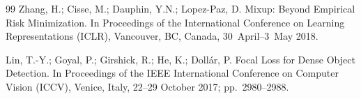 \documentclass[sensors,article,submit,pdftex,oneauthor]{Definitions/mdpi}
\begin{document}
\begin{thebibliography}{99}
Zhang, H.; Cisse, M.; Dauphin, Y.N.; Lopez-Paz, D.
Mixup: Beyond Empirical Risk Minimization. In Proceedings of
the International Conference on Learning Representations (ICLR),
Vancouver, BC, Canada, 30~April--3~May 2018.

Lin, T.-Y.; Goyal, P.; Girshick, R.; He, K.; Doll{\'a}r, P.
Focal Loss for Dense Object Detection. In Proceedings of the
IEEE International Conference on Computer Vision (ICCV),
Venice, Italy, 22--29 October 2017; pp.~2980--2988.

\end{thebibliography}

\PublishersNote{}
\end{document}
